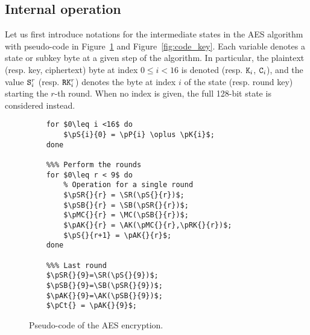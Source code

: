 \documentclass{scrartcl}
\begin{document}
\subsection{Internal operation}

Let us first introduce notations for the intermediate states in the AES algorithm with
pseudo-code in Figure~\ref{fig:code_round} and Figure~\ref{fig:code_key}.
Each variable denotes a state or subkey byte at a given step of the algorithm.
In particular, the plaintext (resp. key, ciphertext) byte at index $0\leq i<16$
is denoted  (resp. $\texttt{K}_{i}$, $\texttt{C}_{i}$), and the value $\texttt{S}_{i}^{r}$ (resp.
$\texttt{RK}_{i}^{r}$) denotes the byte at index $i$ of the state (resp. round key)
starting the $r$-th round.
When no index is given, the full 128-bit state is considered instead.

\begin{figure}
    \begin{lstlisting}[frame=single]
    %%% First key addition
    for $0\leq i <16$ do
        $\pS{i}{0} = \pP{i} \oplus \pK{i}$;
    done
    
    %%% Perform the rounds
    for $0\leq r < 9$ do 
        % Operation for a single round
        $\pSR{}{r} = \SR(\pS{}{r})$;
        $\pSB{}{r} = \SB(\pSR{}{r})$;
        $\pMC{}{r} = \MC(\pSB{}{r})$;
        $\pAK{}{r} = \AK(\pMC{}{r},\pRK{}{r})$;
        $\pS{}{r+1} = \pAK{}{r}$;
    done
    
    %%% Last round
    $\pSR{}{9}=\SR(\pS{}{9})$;
    $\pSB{}{9}=\SB(\pSR{}{9})$;
    $\pAK{}{9}=\AK(\pSB{}{9})$;
    $\pCt{} = \pAK{}{9}$;
    \end{lstlisting}
    \caption{Pseudo-code of the AES encryption.}
    \label{fig:code_round}
\end{figure}
\end{document}
